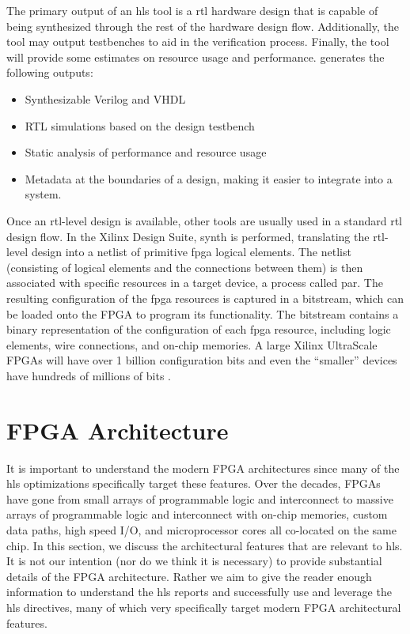 The primary output of an \gls{hls} tool is a \gls{rtl} hardware design that is capable of being synthesized through the rest of the hardware design flow. Additionally, the tool may output testbenches to aid in the verification process. Finally, the tool will provide some estimates on resource usage and performance.  \VHLS generates the following outputs:
\begin{itemize}
\item Synthesizable Verilog and VHDL
\item RTL simulations based on the design testbench
\item Static analysis of performance and resource usage
\item Metadata at the boundaries of a design, making it easier to integrate into a system.
\end{itemize}

Once an \gls{rtl}-level design is available, other tools are usually used in a standard \gls{rtl} design flow.  In the Xilinx \vivado Design Suite, \gls{synth} is performed, translating the \gls{rtl}-level design into a \gls{netlist} of primitive \gls{fpga} logical elements.  The \gls{netlist} (consisting of logical elements and the connections between them) is then associated with specific resources in a target device, a process called \gls{par}.  The resulting configuration of the \gls{fpga} resources is captured in a \gls{bitstream}, which can be loaded onto the FPGA to program its functionality.  The \gls{bitstream} contains a binary representation of the configuration of each \gls{fpga} resource, including logic elements, wire connections, and on-chip memories. A large Xilinx UltraScale FPGAs will have over 1 billion configuration bits and even the ``smaller'' devices have hundreds of millions of bits \cite{ultrascaleArchConfig}. 


\section{FPGA Architecture}

It is important to understand the modern FPGA architectures since many of the \gls{hls} optimizations specifically target these features. Over the decades, FPGAs have gone from small arrays of programmable logic and interconnect to massive arrays of programmable logic and interconnect with on-chip memories, custom data paths, high speed I/O, and microprocessor cores all co-located on the same chip. In this section, we discuss the  architectural features that are relevant to \gls{hls}. It is not our intention (nor do we think it is necessary) to provide substantial details of the FPGA architecture. Rather we aim to give the reader enough information to understand the \gls{hls} reports and successfully use and leverage the \gls{hls} directives, many of which very specifically target modern FPGA architectural features.


